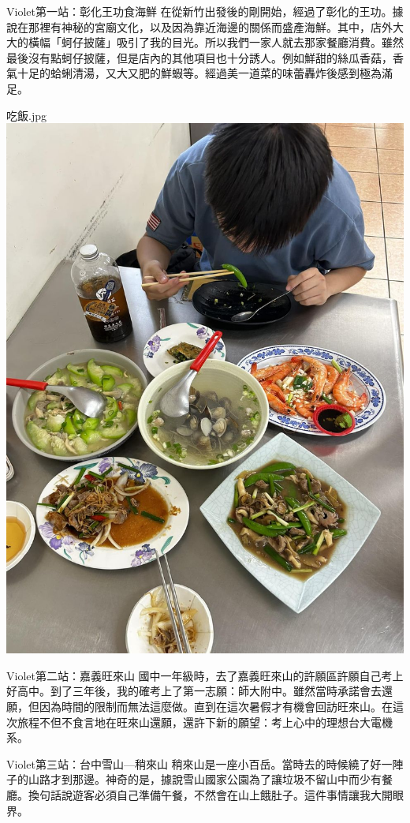 \documentclass{article}
\begin{document}

\begin{large}
\begin{boxpar}{Violet}{第一站：彰化王功食海鮮}
在從新竹出發後的剛開始，經過了彰化的王功。據說在那裡有神秘的宮廟文化，以及因為靠近海邊的關係而盛產海鮮。其中，店外大大的橫幅「蚵仔披薩」吸引了我的目光。所以我們一家人就去那家餐廳消費。雖然最後沒有點蚵仔披薩，但是店內的其他項目也十分誘人。例如鮮甜的絲瓜香菇，香氣十足的蛤蜊清湯，又大又肥的鮮蝦等。經過美一道菜的味蕾轟炸後感到極為滿足。
\begin{imgbox}{吃飯.jpg}
    \includegraphics[width=0.65\textheight]{src/seafood.jpg}
\end{imgbox}

\end{boxpar}
    \begin{boxpar}{Violet}{第二站：嘉義旺來山}
        國中一年級時，去了嘉義旺來山的許願區許願自己考上好高中。到了三年後，我的確考上了第一志願：師大附中。雖然當時承諾會去還願，但因為時間的限制而無法這麼做。直到在這次暑假才有機會回訪旺來山。在這次旅程不但不食言地在旺來山還願，還許下新的願望：考上心中的理想台大電機系。
    \end{boxpar}
    \begin{boxpar}{Violet}{第三站：台中雪山—稍來山}
        稍來山是一座小百岳。當時去的時候繞了好一陣子的山路才到那邊。神奇的是，據說雪山國家公園為了讓垃圾不留山中而少有餐廳。換句話說遊客必須自己準備午餐，不然會在山上餓肚子。這件事情讓我大開眼界。
    \end{boxpar}

\end{large}
\end{document}
